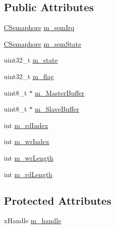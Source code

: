 \subsection*{Public Attributes}
\begin{DoxyCompactItemize}
\item 
\hyperlink{class_c_semaphore}{C\-Semaphore} \hyperlink{class_c_i2_c_afe268dd16ca42e8542c67a7f574df789}{m\-\_\-sem\-Irq}
\item 
\hyperlink{class_c_semaphore}{C\-Semaphore} \hyperlink{class_c_i2_c_aed6c05c74c281a6ae0dcc8e0203511b1}{m\-\_\-sem\-State}
\item 
uint32\-\_\-t \hyperlink{class_c_i2_c_aa2da331d3ad66d64a25d63405882be4c}{m\-\_\-state}
\item 
uint32\-\_\-t \hyperlink{class_c_i2_c_a4c29db1010457d99b12ac6097219bcc8}{m\-\_\-flag}
\item 
uint8\-\_\-t $\ast$ \hyperlink{class_c_i2_c_ae7fd0860329b89d55cfe5ca214b705e2}{m\-\_\-\-Master\-Buffer}
\item 
uint8\-\_\-t $\ast$ \hyperlink{class_c_i2_c_a4ef901e7efdef3f95faa2dd08d548aed}{m\-\_\-\-Slave\-Buffer}
\item 
int \hyperlink{class_c_i2_c_ad8b02ac3b8cfe93c0e123f7c4d79709b}{m\-\_\-rd\-Index}
\item 
int \hyperlink{class_c_i2_c_ad2e77f79779205f9c2ae13f7a4fc9168}{m\-\_\-wr\-Index}
\item 
int \hyperlink{class_c_i2_c_afc1ac8b1f15f1e74dd4a884fb9fe342a}{m\-\_\-wr\-Length}
\item 
int \hyperlink{class_c_i2_c_a517d08ec5c1a44662ab923bb74c6a25c}{m\-\_\-rd\-Length}
\end{DoxyCompactItemize}
\subsection*{Protected Attributes}
\begin{DoxyCompactItemize}
\item 
x\-Handle \hyperlink{class_c_i2_c_aef073fe282d448add47eb63b3f481205}{m\-\_\-handle}
\end{DoxyCompactItemize}


